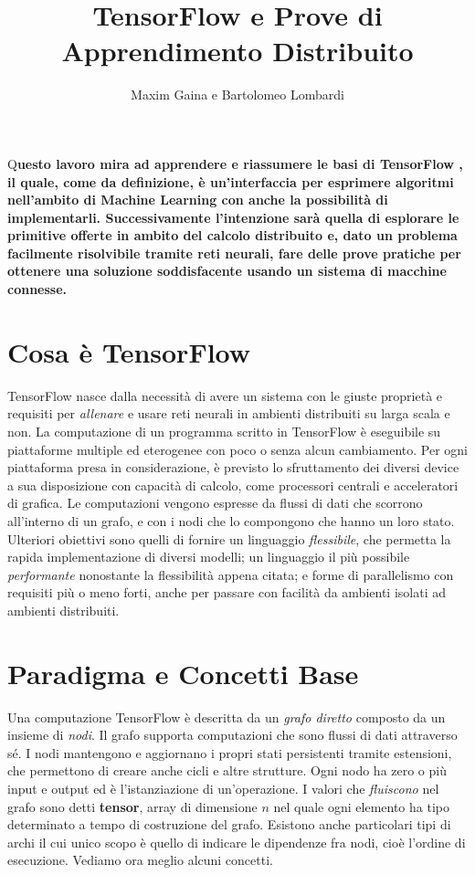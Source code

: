 \documentclass[DIV=calc, paper=a4, fontsize=11pt]{scrartcl}	 %
\title{TensorFlow e Prove di Apprendimento Distribuito} %
\author{Maxim Gaina e Bartolomeo Lombardi} %
\date{} %
\newcommand{\initial}[1]{ %
\lettrine[lines=3,lhang=0.3,nindent=0em]{
\color{DarkGoldenrod}
{\textsf{#1}}}{}}
\begin{document}
	\maketitle
	\thispagestyle{fancy}
	\initial{Q}\textbf{uesto lavoro mira ad apprendere e riassumere le basi di TensorFlow \cite{tf}, il quale, come da definizione, è un'interfaccia per esprimere algoritmi nell'ambito di Machine Learning con anche la possibilità di implementarli. Successivamente l'intenzione sarà quella di esplorare le primitive offerte in ambito del calcolo distribuito e, dato un problema facilmente risolvibile tramite reti neurali, fare delle prove pratiche per ottenere una soluzione soddisfacente usando un sistema di macchine connesse.}
	
	\begin{multicols}{2}
		\tableofcontents
		\section*{Cosa è TensorFlow}
			TensorFlow nasce dalla necessità di avere un sistema con le giuste proprietà e requisiti per \textit{allenare} e usare reti neurali in ambienti distribuiti su larga scala e non. La computazione di un programma scritto in TensorFlow è eseguibile su piattaforme multiple ed eterogenee con poco o senza alcun cambiamento. Per ogni piattaforma presa in considerazione, è previsto lo sfruttamento dei diversi device a sua disposizione con capacità di calcolo, come processori centrali e acceleratori di grafica. Le computazioni vengono espresse da flussi di dati che scorrono all'interno di un grafo, e con i nodi che lo compongono che hanno un loro stato. Ulteriori obiettivi sono quelli di fornire un linguaggio \textit{flessibile}, che permetta la rapida implementazione di diversi modelli; un linguaggio il più possibile \textit{performante} nonostante la flessibilità appena citata; e forme di parallelismo con requisiti più o meno forti, anche per passare con facilità da ambienti isolati ad ambienti distribuiti.
			
		\section{Paradigma e Concetti Base}
			Una computazione TensorFlow è descritta da un \textit{grafo diretto} composto da un insieme di \textit{nodi}. Il grafo supporta computazioni che sono flussi di dati attraverso sé. I nodi mantengono e aggiornano i propri stati persistenti tramite estensioni, che permettono di creare anche cicli e altre strutture. Ogni nodo ha zero o più input e output ed è l'istanziazione di un'operazione. I valori che \textit{fluiscono } nel grafo sono detti \textbf{tensor}, array di dimensione $n$ nel quale ogni elemento ha tipo determinato a tempo di costruzione del grafo. Esistono anche particolari tipi di archi il cui unico scopo è quello di indicare le dipendenze fra nodi, cioè l'ordine di esecuzione. Vediamo ora meglio alcuni concetti.
			

\end{multicols}
\end{document}
